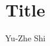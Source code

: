 \documentclass{article}
\title{Title}
\author{Yu-Zhe Shi}
\begin{document}
\newtheorem{proof}{\hspace{2em}Proof}
\newtheorem{lemma}{\hspace{2em}Lemma}
\newtheorem{definition}{\hspace{2em}Definition}
\newtheorem{proposition}{\hspace{2em}Proposition}
\maketitle
\end{document}
